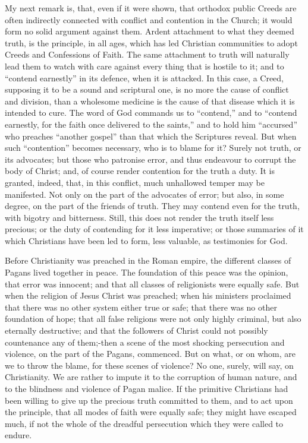 \documentclass[
]{book}
\begin{document}
My next remark is, that, even if it were shown, that orthodox public Creeds are often indirectly connected with conflict and contention in the Church; it would form no solid argument against them. Ardent attachment to what they deemed truth, is the principle, in all ages, which has led Christian communities to adopt Creeds and Confessions of Faith. The same attachment to truth will naturally lead them to watch with care against every thing that is hostile to it; and to ``contend earnestly'' in its defence, when it is attacked. In this case, a Creed, supposing it to be a sound and scriptural one, is no more the cause of conflict and division, than a wholesome medicine is the cause of that disease which it is intended to cure. The word of God commands us to ``contend,'' and to ``contend earnestly, for the faith once delivered to the saints,'' and to hold him ``accursed'' who preaches ``another gospel'' than that which the Scriptures reveal. But when such ``contention'' becomes necessary, who is to blame for it? Surely not truth, or its advocates; but those who patronise error, and thus endeavour to corrupt the body of Christ; and, of course render contention for the truth a duty. It is granted, indeed, that, in this conflict, much unhallowed temper may be manifested. Not only on the part of the advocates of error; but also, in some degree, on the part of the friends of truth. They may contend even for the truth, with bigotry and bitterness. Still, this does not render the truth itself less precious; or the duty of contending for it less imperative; or those summaries of it which Christians have been led to form, less valuable, as testimonies for God.

Before Christianity was preached in the Roman empire, the different classes of Pagans lived together in peace. The foundation of this peace was the opinion, that error was innocent; and that all classes of religionists were equally safe. But when the religion of Jesus Christ was preached; when his ministers proclaimed that there was no other system either true or safe; that there was no other foundation of hope; that all false religions were not only highly criminal, but also eternally destructive; and that the followers of Christ could not possibly countenance any of them;-then a scene of the most shocking persecution and violence, on the part of the Pagans, commenced. But on what, or on whom, are we to throw the blame, for these scenes of violence? No one, surely, will say, on Christianity. We are rather to impute it to the corruption of human nature, and to the blindness and violence of Pagan malice. If the primitive Christians had been willing to give up the precious truth committed to them, and to act upon the principle, that all modes of faith were equally safe; they might have escaped much, if not the whole of the dreadful persecution which they were called to endure.
\end{document}
